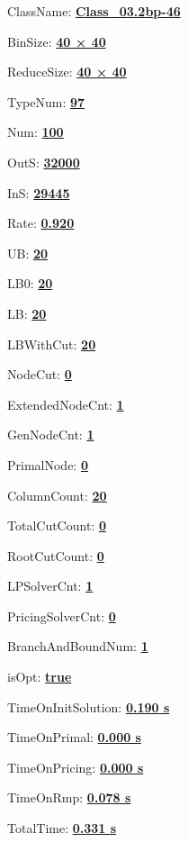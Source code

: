 \documentclass[11pt]{article}
\begin{document}
\pagestyle{empty}


ClassName: \underline{\textbf{Class_03.2bp-46}}
\par
BinSize: \underline{\textbf{40 × 40}}
\par
ReduceSize: \underline{\textbf{40 × 40}}
\par
TypeNum: \underline{\textbf{97}}
\par
Num: \underline{\textbf{100}}
\par
OutS: \underline{\textbf{32000}}
\par
InS: \underline{\textbf{29445}}
\par
Rate: \underline{\textbf{0.920}}
\par
UB: \underline{\textbf{20}}
\par
LB0: \underline{\textbf{20}}
\par
LB: \underline{\textbf{20}}
\par
LBWithCut: \underline{\textbf{20}}
\par
NodeCut: \underline{\textbf{0}}
\par
ExtendedNodeCnt: \underline{\textbf{1}}
\par
GenNodeCnt: \underline{\textbf{1}}
\par
PrimalNode: \underline{\textbf{0}}
\par
ColumnCount: \underline{\textbf{20}}
\par
TotalCutCount: \underline{\textbf{0}}
\par
RootCutCount: \underline{\textbf{0}}
\par
LPSolverCnt: \underline{\textbf{1}}
\par
PricingSolverCnt: \underline{\textbf{0}}
\par
BranchAndBoundNum: \underline{\textbf{1}}
\par
isOpt: \underline{\textbf{true}}
\par
TimeOnInitSolution: \underline{\textbf{0.190 s}}
\par
TimeOnPrimal: \underline{\textbf{0.000 s}}
\par
TimeOnPricing: \underline{\textbf{0.000 s}}
\par
TimeOnRmp: \underline{\textbf{0.078 s}}
\par
TotalTime: \underline{\textbf{0.331 s}}
\par
\newpage


\end{document}

